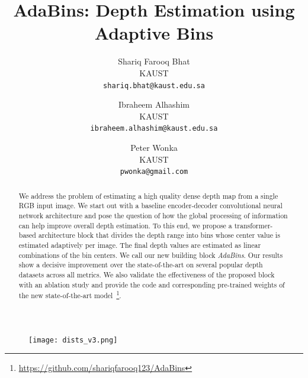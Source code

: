 \documentclass[final]{cvpr}
\begin{document}
\title{AdaBins: Depth Estimation using Adaptive Bins}

\author{Shariq Farooq Bhat \\
KAUST\\
{\tt\small shariq.bhat@kaust.edu.sa}

\and
Ibraheem Alhashim\\
KAUST\\
{\tt\small ibraheem.alhashim@kaust.edu.sa}

\and
Peter Wonka\\
KAUST\\
{\tt\small pwonka@gmail.com}
}

\maketitle


\begin{abstract}
We address the problem of estimating a high quality dense depth map from a single RGB input image. We start out with a baseline encoder-decoder convolutional neural network architecture and pose the question of how the global processing of information can help improve overall depth estimation. To this end, we propose a transformer-based architecture block that divides the depth range into bins whose center value is estimated adaptively per image. The final depth values are estimated as linear combinations of the bin centers. We call our new building block \emph{AdaBins}. Our results show a decisive improvement over the state-of-the-art on several popular depth datasets across all metrics. We also validate the effectiveness of the proposed block with an ablation study and provide the code and corresponding pre-trained weights of the new state-of-the-art model~\footnote{\url{https://github.com/shariqfarooq123/AdaBins}}.
\end{abstract}



\begin{figure}[t]
\centering
    \texttt{[image: dists\_v3.png]}
\end{figure}
\end{document}
